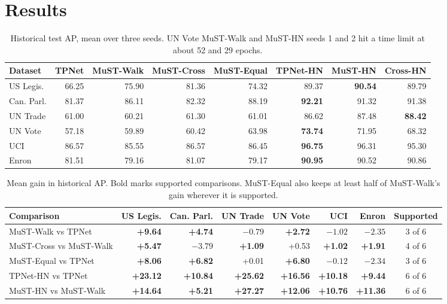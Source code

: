 \documentclass[11pt,a4paper]{article}
\theoremstyle{remark}
\begin{document}
\section{Results}\label{sec:results}
\begin{table}[h]\centering\small\setlength{\tabcolsep}{4.5pt}
\begin{tabular}{lrrrrrrr}
\toprule
Dataset & TPNet & MuST-Walk & MuST-Cross & MuST-Equal & TPNet-HN & MuST-HN & Cross-HN\\
\midrule
US Legis. & 66.25 & 75.90 & 81.36 & 74.32 & 89.37 & \textbf{90.54} & 89.79\\
Can. Parl. & 81.37 & 86.11 & 82.32 & 88.19 & \textbf{92.21} & 91.32 & 91.38\\
UN Trade & 61.00 & 60.21 & 61.30 & 61.01 & 86.62 & 87.48 & \textbf{88.42}\\
UN Vote & 57.18 & 59.89 & 60.42 & 63.98 & \textbf{73.74} & 71.95 & 68.32\\
UCI & 86.57 & 85.55 & 86.57 & 86.45 & \textbf{96.75} & 96.31 & 95.30\\
Enron & 81.51 & 79.16 & 81.07 & 79.17 & \textbf{90.95} & 90.52 & 90.86\\
\bottomrule
\end{tabular}
\caption{Historical test AP, mean over three seeds. UN Vote MuST-Walk and MuST-HN seeds 1 and 2 hit a time limit at about 52 and 29 epochs.}\label{tab:main}
\end{table}

\begin{table}[h]\centering\small\setlength{\tabcolsep}{4.5pt}
\begin{tabular}{lrrrrrr|c}
\toprule
Comparison & US Legis. & Can. Parl. & UN Trade & UN Vote & UCI & Enron & Supported\\
\midrule
MuST-Walk vs TPNet & \textbf{+9.64} & \textbf{+4.74} & $-0.79$ & \textbf{+2.72} & $-1.02$ & $-2.35$ & 3 of 6\\
MuST-Cross vs MuST-Walk & \textbf{+5.47} & $-3.79$ & \textbf{+1.09} & +0.53 & \textbf{+1.02} & \textbf{+1.91} & 4 of 6\\
MuST-Equal vs TPNet & \textbf{+8.06} & \textbf{+6.82} & +0.01 & \textbf{+6.80} & $-0.12$ & $-2.34$ & 3 of 6\\
TPNet-HN vs TPNet & \textbf{+23.12} & \textbf{+10.84} & \textbf{+25.62} & \textbf{+16.56} & \textbf{+10.18} & \textbf{+9.44} & 6 of 6\\
MuST-HN vs MuST-Walk & \textbf{+14.64} & \textbf{+5.21} & \textbf{+27.27} & \textbf{+12.06} & \textbf{+10.76} & \textbf{+11.36} & 6 of 6\\
\bottomrule
\end{tabular}
\caption{Mean gain in historical AP. Bold marks supported comparisons. MuST-Equal also keeps at least half of MuST-Walk's gain wherever it is supported.}\label{tab:gains}
\end{table}
\end{document}
